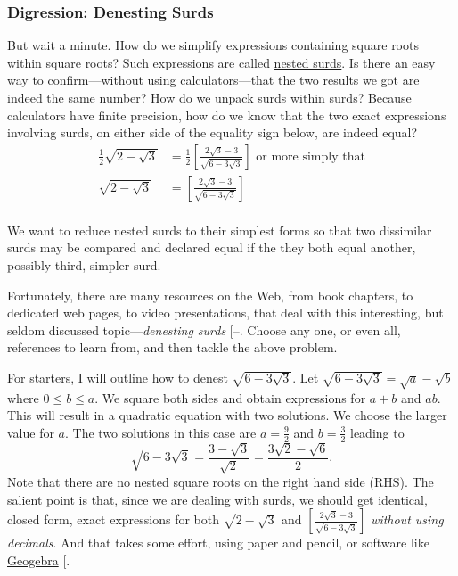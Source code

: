 \documentclass[
  a4paper,
]{article}
\begin{document}
\subsubsection{Digression: Denesting
Surds}\label{digression-denesting-surds}

But wait a minute. How do we simplify expressions containing square
roots within square roots? Such expressions are called
\href{https://undergroundmathematics.org/thinking-about-algebra/nested-surds/solution}{nested
surds}. Is there an easy way to confirm---without using
calculators---that the two results we got are indeed the same number?
How do we unpack surds within surds? Because calculators have finite
precision, how do we know that the two exact expressions involving
surds, on either side of the equality sign below, are indeed equal? \[
\begin{aligned}
\frac{1}{2}\sqrt{2 - \sqrt{3}} &= \frac{1}{2}\left[\frac{2\sqrt{3} - 3}{\sqrt{6 - 3\sqrt{3}}}\right]\mbox{ or more simply that}\\
\sqrt{2 - \sqrt{3}}&= \left[\frac{2\sqrt{3} - 3}{\sqrt{6 - 3\sqrt{3}}}\right]\\
\end{aligned}
\]

We want to reduce nested surds to their simplest forms so that two
dissimilar surds may be compared and declared equal if the they both
equal another, possibly third, simpler surd.

Fortunately, there are many resources on the Web, from book chapters, to
dedicated web pages, to video presentations, that deal with this
interesting, but seldom discussed topic---\emph{denesting surds}
{[}--\citeproc{ref-ds-yt-method}{8}{]}.
Choose any one, or even all, references to learn from, and then tackle
the above problem.

For starters, I will outline how to denest \(\sqrt{6-3\sqrt{3}}\). Let
\(\sqrt{6-3\sqrt{3}} = \sqrt{a} - \sqrt{b}\) where \(0 \leq b \leq a\).
We square both sides and obtain expressions for \(a + b\) and \(ab\).
This will result in a quadratic equation with two solutions. We choose
the larger value for \(a\). The two solutions in this case are
\(a = \frac{9}{2}\) and \(b = \frac{3}{2}\) leading to \[
\sqrt{6-3\sqrt{3}} = \frac{3 - \sqrt{3}}{\sqrt{2}} = \frac{3\sqrt{2} - \sqrt{6}}{2}.
\] Note that there are no nested square roots on the right hand side
(RHS). The salient point is that, since we are dealing with surds, we
should get identical, closed form, exact expressions for both
\(\sqrt{2 - \sqrt{3}}\) and
\(\left[\frac{2\sqrt{3} - 3}{\sqrt{6 - 3\sqrt{3}}}\right]\)
\emph{without using decimals}. And that takes some effort, using paper
and pencil, or software like \href{https://www.geogebra.org/}{Geogebra}
{[}\citeproc{ref-geogebra}{9}{]}.
\end{document}
